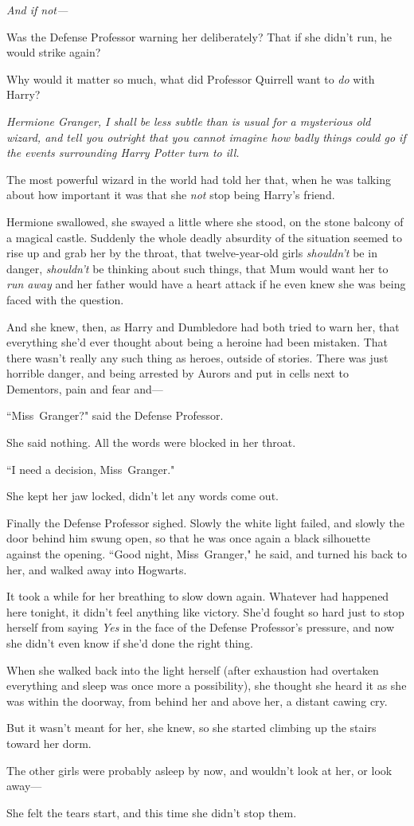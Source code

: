 \emph{And if not—}

Was the Defense Professor warning her deliberately? That if she didn't run, he would strike again?

Why would it matter so much, what did Professor Quirrell want to \emph{do} with Harry?

\emph{Hermione Granger, I shall be less subtle than is usual for a mysterious old wizard, and tell you outright that you cannot \emph{imagine} how badly things could go if the events surrounding Harry Potter turn to ill.}

The most powerful wizard in the world had told her that, when he was talking about how important it was that she \emph{not} stop being Harry's friend.

Hermione swallowed, she swayed a little where she stood, on the stone balcony of a magical castle. Suddenly the whole deadly absurdity of the situation seemed to rise up and grab her by the throat, that twelve-year-old girls \emph{shouldn't} be in danger, \emph{shouldn't} be thinking about such things, that Mum would want her to \emph{run away} and her father would have a heart attack if he even knew she was being faced with the question.

And she knew, then, as Harry and Dumbledore had both tried to warn her, that everything she'd ever thought about being a heroine had been mistaken. That there wasn't really any such thing as heroes, outside of stories. There was just horrible danger, and being arrested by Aurors and put in cells next to Dementors, pain and fear and—

``Miss~Granger?" said the Defense Professor.

She said nothing. All the words were blocked in her throat.

``I need a decision, Miss~Granger."

She kept her jaw locked, didn't let any words come out.

Finally the Defense Professor sighed. Slowly the white light failed, and slowly the door behind him swung open, so that he was once again a black silhouette against the opening. ``Good night, Miss~Granger," he said, and turned his back to her, and walked away into Hogwarts.

It took a while for her breathing to slow down again. Whatever had happened here tonight, it didn't feel anything like victory. She'd fought so hard just to stop herself from saying \emph{Yes} in the face of the Defense Professor's pressure, and now she didn't even know if she'd done the right thing.

When she walked back into the light herself (after exhaustion had overtaken everything and sleep was once more a possibility), she thought she heard it as she was within the doorway, from behind her and above her, a distant cawing cry.

But it wasn't meant for her, she knew, so she started climbing up the stairs toward her dorm.

The other girls were probably asleep by now, and wouldn't look at her, or look away—

She felt the tears start, and this time she didn't stop them.

